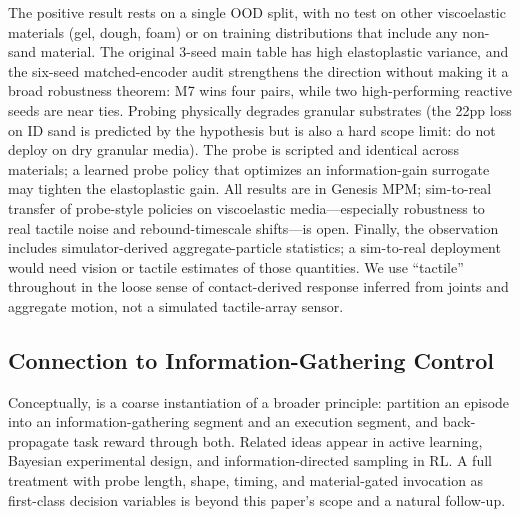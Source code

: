 The positive result rests on a single OOD split, with no test on other viscoelastic materials (gel, dough, foam) or on training distributions that include any non-sand material. The original 3-seed main table has high elastoplastic variance, and the six-seed matched-encoder audit strengthens the direction without making it a broad robustness theorem: M7 wins four pairs, while two high-performing reactive seeds are near ties. Probing physically degrades granular substrates (the 22pp loss on ID sand is predicted by the hypothesis but is also a hard scope limit: do not deploy \PTA{} on dry granular media). The probe is scripted and identical across materials; a learned probe policy that optimizes an information-gain surrogate may tighten the elastoplastic gain. All results are in Genesis MPM; sim-to-real transfer of probe-style policies on viscoelastic media---especially robustness to real tactile noise and rebound-timescale shifts---is open. Finally, the observation includes simulator-derived aggregate-particle statistics; a sim-to-real deployment would need vision or tactile estimates of those quantities. We use ``tactile'' throughout in the loose sense of contact-derived response inferred from joints and aggregate motion, not a simulated tactile-array sensor.

\subsection{Connection to Information-Gathering Control}

Conceptually, \PTA{} is a coarse instantiation of a broader principle: partition an episode into an information-gathering segment and an execution segment, and back-propagate task reward through both. Related ideas appear in active learning, Bayesian experimental design, and information-directed sampling in RL. A full treatment with probe length, shape, timing, and material-gated invocation as first-class decision variables is beyond this paper's scope and a natural follow-up.
